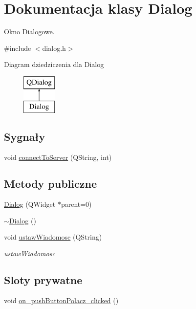 \hypertarget{classDialog}{\section{Dokumentacja klasy Dialog}
\label{classDialog}
}


Okno Dialogowe.  




{\ttfamily \#include $<$dialog.\-h$>$}

Diagram dziedziczenia dla Dialog\begin{figure}[H]
\begin{center}
\leavevmode
\includegraphics[height=2.000000cm]{classDialog}
\end{center}
\end{figure}
\subsection*{Sygnały}
\begin{DoxyCompactItemize}
\item 
void \hyperlink{classDialog_a88d467b80921a394962d27edb36180f6}{connect\-To\-Server} (Q\-String, int)
\end{DoxyCompactItemize}
\subsection*{Metody publiczne}
\begin{DoxyCompactItemize}
\item 
\hyperlink{classDialog_acfa2063f9f962d394c6a645b6e7e08d8}{Dialog} (Q\-Widget $\ast$parent=0)
\item 
\hyperlink{classDialog_a2a1fe6ef28513eed13bfcd3a4da83ccb}{$\sim$\-Dialog} ()
\item 
void \hyperlink{classDialog_ab2375beb017973ea416f1c3f3494c100}{ustaw\-Wiadomosc} (Q\-String)
\begin{DoxyCompactList}\small\item\em ustaw\-Wiadomosc \end{DoxyCompactList}\end{DoxyCompactItemize}
\subsection*{Sloty prywatne}
\begin{DoxyCompactItemize}
\item 
void \hyperlink{classDialog_ae3619019db8ba37af8a2b30491272a28}{on\-\_\-push\-Button\-Polacz\-\_\-clicked} ()
\end{DoxyCompactItemize}
